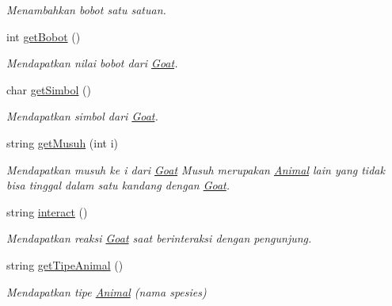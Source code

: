 \begin{DoxyCompactItemize}
\begin{DoxyCompactList}\small\item\em Menambahkan bobot satu satuan. \end{DoxyCompactList}\item 
int \hyperlink{classGoat_a0f5c5cce66f3447337754817ac079955}{get\-Bobot} ()
\begin{DoxyCompactList}\small\item\em Mendapatkan nilai bobot dari \hyperlink{classGoat}{Goat}. \end{DoxyCompactList}\item 
char \hyperlink{classGoat_a9de58c004a28fdd00f118edb560636b1}{get\-Simbol} ()
\begin{DoxyCompactList}\small\item\em Mendapatkan simbol dari \hyperlink{classGoat}{Goat}. \end{DoxyCompactList}\item 
string \hyperlink{classGoat_a789f9f47ef0646fe39c28df41bda8be5}{get\-Musuh} (int i)
\begin{DoxyCompactList}\small\item\em Mendapatkan musuh ke i dari \hyperlink{classGoat}{Goat} Musuh merupakan \hyperlink{classAnimal}{Animal} lain yang tidak bisa tinggal dalam satu kandang dengan \hyperlink{classGoat}{Goat}. \end{DoxyCompactList}\item 
string \hyperlink{classGoat_ac282f442721e8b8bb750eacd45df61b6}{interact} ()
\begin{DoxyCompactList}\small\item\em Mendapatkan reaksi \hyperlink{classGoat}{Goat} saat berinteraksi dengan pengunjung. \end{DoxyCompactList}\item 
string \hyperlink{classGoat_aca420bb0962e0b55339c8f70c217132b}{get\-Tipe\-Animal} ()
\begin{DoxyCompactList}\small\item\em Mendapatkan tipe \hyperlink{classAnimal}{Animal} (nama spesies) \end{DoxyCompactList}\end{DoxyCompactItemize}
